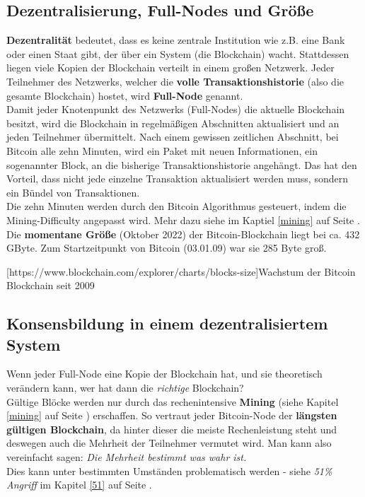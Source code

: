 \documentclass[10pt,a4paper,titlepage]{paper}
\begin{document}
\subsection{Dezentralisierung, Full-Nodes und Größe}
\textbf{Dezentralität} bedeutet, dass es keine zentrale Institution wie  z.B. eine Bank oder einen Staat gibt, der über ein System (die Blockchain) wacht. Stattdessen liegen viele Kopien der Blockchain verteilt in einem großen Netzwerk. Jeder Teilnehmer des Netzwerks, welcher die \textbf{volle Transaktionshistorie} (also die gesamte Blockchain) hostet, wird \textbf{Full-Node} genannt.\\
Damit jeder Knotenpunkt des Netzwerks (Full-Nodes) die aktuelle Blockchain besitzt, wird die Blockchain in regelmäßigen Abschnitten aktualisiert und an jeden Teilnehmer übermittelt.
Nach einem gewissen zeitlichen Abschnitt, bei Bitcoin alle zehn Minuten, wird ein Paket mit neuen Informationen, ein sogenannter Block, an die bisherige Transaktionshistorie angehängt. Das hat den Vorteil, dass nicht jede einzelne Transaktion aktualisiert werden muss, sondern ein Bündel von Transaktionen.\\
Die zehn Minuten werden durch den Bitcoin Algorithmus gesteuert, indem die Mining-Difficulty angepasst wird. Mehr dazu siehe im Kaptiel \ref{mining} auf Seite \pageref{mining}.
Die \textbf{momentane Größe} (Oktober 2022) der Bitcoin-Blockchain liegt bei ca. 432 GByte. Zum Startzeitpunkt von Bitcoin (03.01.09) war sie 285 Byte groß. 
\begin{center}
[https://www.blockchain.com/explorer/charts/blocks-size]{Wachstum der Bitcoin Blockchain seit 2009}
\end{center}

\subsection{Konsensbildung in einem dezentralisiertem System}
Wenn jeder Full-Node eine Kopie der Blockchain hat, und sie theoretisch verändern kann, wer hat dann die \textit{richtige} Blockchain?\\
Gültige Blöcke werden nur durch das rechenintensive \textbf{Mining} (siehe Kapitel \ref{mining} auf Seite \pageref{mining}) erschaffen. So vertraut jeder Bitcoin-Node der \textbf{längsten gültigen Blockchain}, da hinter dieser die meiste Rechenleistung steht und deswegen auch die Mehrheit der Teilnehmer vermutet wird. Man kann also vereinfacht sagen: \textit{Die Mehrheit bestimmt was wahr ist.} \\
Dies kann unter bestimmten Umständen problematisch werden - siehe \textit{51\% Angriff} im Kapitel \ref{51} auf Seite \pageref{51}.\\
\end{document}
